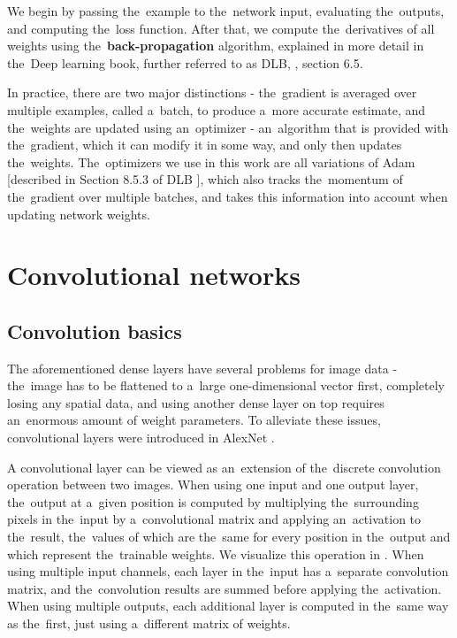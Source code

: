 We begin by passing the~example to the~network input, evaluating the~outputs, and computing the~loss function. After that, we compute the~derivatives of all weights using the~\textbf{back-propagation} algorithm, explained in more detail in the~Deep learning book, further referred to as DLB, \citep{deep_learning_book}, section 6.5.

In practice, there are two major distinctions - the~gradient is averaged over multiple examples, called a~batch, to produce a~more accurate estimate, and the~weights are updated using an~optimizer - an~algorithm that is provided with the~gradient, which it can modify it in some way, and only then updates the~weights. The~optimizers we use in this work are all variations of Adam [described in Section 8.5.3 of DLB \citep{deep_learning_book}], which also tracks the~momentum of the~gradient over multiple batches, and takes this information into account when updating network weights.


\section{Convolutional networks}

\subsection{Convolution basics}

The aforementioned dense layers have several problems for image data - the~image has to be flattened to a~large one-dimensional vector first, completely losing any spatial data, and using another dense layer on top requires an~enormous amount of weight parameters. To alleviate these issues, convolutional layers were introduced in AlexNet \citep{alex_net}.

A convolutional layer can be viewed as an~extension of the~discrete convolution operation between two images. When using one input and one output layer, the~output at a~given position is computed by multiplying the~surrounding pixels in the~input by a~convolutional matrix and applying an~activation to the~result, the~values of which are the~same for every position in the~output and which represent the~trainable weights. We visualize this operation in . When using multiple input channels, each layer in the~input has a~separate convolution matrix, and the~convolution results are summed before applying the~activation. When using multiple outputs, each additional layer is computed in the~same way as the~first, just using a~different matrix of weights.



